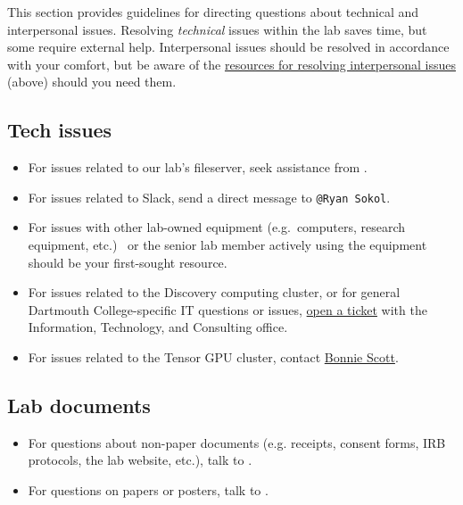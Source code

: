 \documentclass{tufte-book} %
\newcommand{\ourschool}{Dartmouth College}
\begin{document}

\noindent This section provides guidelines for directing
questions about technical and interpersonal issues.
Resolving \textit{technical} issues within the lab
saves time, but some require external help.
Interpersonal issues should be resolved in accordance
with your comfort, but be aware of the
\hyperref[sec:interpersonal]{resources for resolving interpersonal
  issues} (above) should you need them.

\subsection{Tech issues}
\begin{itemize}
\item For issues related to our lab's fileserver, seek assistance from
  \director.

\item For issues related to Slack, send a direct message to \texttt{@Ryan Sokol}.

\item For issues with other lab-owned equipment (e.g.~computers,
  research equipment, etc.) \coordinator~or the senior lab member
  actively using the equipment should be your first-sought resource.

\item For issues related to the Discovery computing cluster, or for general \ourschool-specific IT questions or issues,
  \href{mailto:help@dartmouth.edu}{open a ticket} with the Information,
  Technology, and Consulting office.

\item For issues related to the Tensor GPU cluster, contact \href{mailto:Bonnie.J.Scott@dartmouth.edu}{Bonnie Scott}.
\end{itemize}

\subsection{Lab documents}
\begin{itemize}
\item For questions about non-paper documents (e.g. receipts, consent
  forms, IRB protocols, the lab website, etc.), talk to \coordinator.

\item For questions on papers or posters, talk to \director.
\end{itemize}
\end{document}
